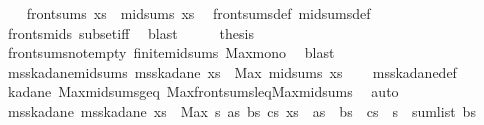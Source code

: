 \begin{isabellebody}
%
\isadelimproof
%
\endisadelimproof
%
\isatagproof
{}\isamarkupfalse%
{\isacharminus}{\kern0pt}\isanewline
\ \ \isamarkupfalse%
\ {\isachardoublequoteopen}front{\isacharunderscore}{\kern0pt}sums\ xs\ {\isasymsubseteq}\ mid{\isacharunderscore}{\kern0pt}sums\ xs{\isachardoublequoteclose}\ \isamarkupfalse%
\ front{\isacharunderscore}{\kern0pt}sums{\isacharunderscore}{\kern0pt}def\ mid{\isacharunderscore}{\kern0pt}sums{\isacharunderscore}{\kern0pt}def\ \isamarkupfalse%
\ fronts{\isacharunderscore}{\kern0pt}mids\ subset{\isacharunderscore}{\kern0pt}iff\ \isamarkupfalse%
\ blast\isanewline
\ \ \isamarkupfalse%
\ \isamarkupfalse%
\ {\isacharquery}{\kern0pt}thesis\ \isamarkupfalse%
\ front{\isacharunderscore}{\kern0pt}sums{\isacharunderscore}{\kern0pt}not{\isacharunderscore}{\kern0pt}empty\ finite{\isacharunderscore}{\kern0pt}mid{\isacharunderscore}{\kern0pt}sums\ Max{\isacharunderscore}{\kern0pt}mono\ \isamarkupfalse%
\ blast\isanewline
{}\isamarkupfalse%
%
\endisatagproof
{\isafoldproof}%
%
\isadelimproof
\isanewline
%
\endisadelimproof
\isanewline
{}\isamarkupfalse%
\ mss{\isacharunderscore}{\kern0pt}kadane{\isacharunderscore}{\kern0pt}mid{\isacharunderscore}{\kern0pt}sums{\isacharcolon}{\kern0pt}\ {\isachardoublequoteopen}mss{\isacharunderscore}{\kern0pt}kadane\ xs\ {\isacharequal}{\kern0pt}\ Max\ {\isacharparenleft}{\kern0pt}mid{\isacharunderscore}{\kern0pt}sums\ xs{\isacharparenright}{\kern0pt}{\isachardoublequoteclose}\isanewline
%
\isadelimproof
\ \ %
\endisadelimproof
%
\isatagproof
{}\isamarkupfalse%
\ mss{\isacharunderscore}{\kern0pt}kadane{\isacharunderscore}{\kern0pt}def\ \isamarkupfalse%
\ kadane\ Max{\isacharunderscore}{\kern0pt}mid{\isacharunderscore}{\kern0pt}sums{\isacharunderscore}{\kern0pt}geq{\isacharunderscore}{\kern0pt}{}\ Max{\isacharunderscore}{\kern0pt}front{\isacharunderscore}{\kern0pt}sums{\isacharunderscore}{\kern0pt}leq{\isacharunderscore}{\kern0pt}Max{\isacharunderscore}{\kern0pt}mid{\isacharunderscore}{\kern0pt}sums\ \isamarkupfalse%
\ auto%
\endisatagproof
{\isafoldproof}%
%
\isadelimproof
\isanewline
%
\endisadelimproof
\isanewline
{}\isamarkupfalse%
\ mss{\isacharunderscore}{\kern0pt}kadane{\isacharcolon}{\kern0pt}\ {\isachardoublequoteopen}mss{\isacharunderscore}{\kern0pt}kadane\ xs\ {\isacharequal}{\kern0pt}\ Max\ {\isacharbraceleft}{\kern0pt}s{\isachardot}{\kern0pt}\ {\isasymexists}as\ bs\ cs{\isachardot}{\kern0pt}\ xs\ {\isacharequal}{\kern0pt}\ as\ {\isacharat}{\kern0pt}\ bs\ {\isacharat}{\kern0pt}\ cs\ {\isasymand}\ s\ {\isacharequal}{\kern0pt}\ sum{\isacharunderscore}{\kern0pt}list\ bs{\isacharbraceright}{\kern0pt}{\isachardoublequoteclose}\isanewline

\end{isabellebody}
